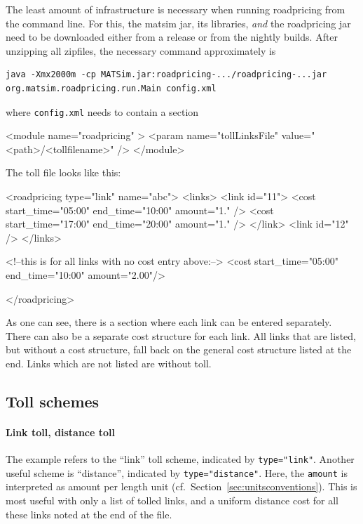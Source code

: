 The least amount of infrastructure is necessary when running roadpricing from the command line.  For this, the \acrshort{matsim} jar, its libraries, \emph{and} the roadpricing jar need to be downloaded either from a release or from the nightly builds.   After unzipping all zipfiles, the necessary command approximately is
\begin{lstlisting}
java -Xmx2000m -cp MATSim.jar:roadpricing-.../roadpricing-...jar org.matsim.roadpricing.run.Main config.xml  
\end{lstlisting}
where \lstinline$config.xml$ needs to contain a section
\begin{xml}
	<module name="roadpricing" >
		<param name="tollLinksFile" value="<path>/<tollfilename>" />
	</module>
\end{xml}
The toll file looks like this:
\begin{xml}
<roadpricing type="link" name="abc">
   <links>
      <link id="11">
         <cost start_time="05:00" end_time="10:00" amount="1." />
         <cost start_time="17:00" end_time="20:00" amount="1." />
      </link>             
      <link id="12" />
   </links>

   <!--this is for all links with no cost entry above:-->
   <cost start_time="05:00" end_time="10:00" amount="2.00"/>

</roadpricing>
\end{xml}
As one can see, there is a section where each link can be entered separately.  There can also be a separate cost structure for each link.  All links that are listed, but without a cost structure, fall back on the general cost structure listed at the end.  Links which are not listed are without toll.

\subsection{Toll schemes}

\paragraph{Link toll, distance toll} The example refers to the ``link'' toll scheme, indicated by \lstinline$type="link"$. Another useful scheme is ``distance'', indicated by \lstinline$type="distance"$.  Here, the \lstinline$amount$ is interpreted as amount per length unit (cf.\ Section~\ref{sec:unitsconventions}).   This is most useful with only a list of tolled links, and a uniform distance cost for all these links noted at the end of the file.

